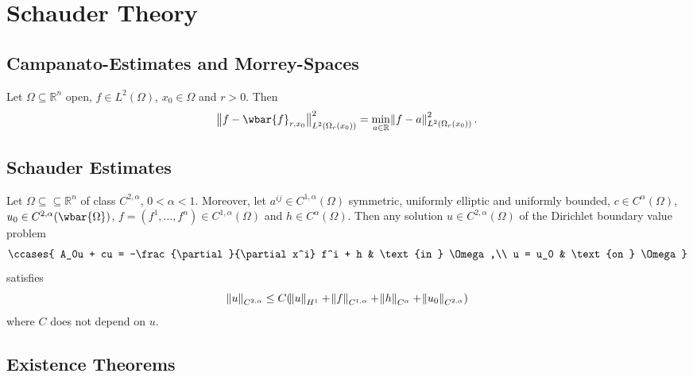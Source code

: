 \section*{Schauder Theory}
\subsection*{Campanato-Estimates and Morrey-Spaces}

\begin{lemma}
	Let $\Omega \subseteq \mathbb{R}^n$ open, $f \in L^2(\Omega)$, $x_0 \in \Omega$ and $r > 0$. Then
	\begin{equation*}
		\norm[1]{f - \wbar{f}_{r,x_0}}_{L^2(\Omega_r(x_0))}^2 = \min_{a \in \mathbb{R}} \norm{f - a}^2_{L^2(\Omega_r(x_0))}.
	\end{equation*}
\end{lemma}

\subsection*{Schauder Estimates}

\begin{theorem}
	\label{thm:gSe}
	Let $\Omega \subseteq \subseteq \mathbb{R}^n$ of class $C^{2,\alpha}$, $0 < \alpha < 1$. Moreover, let $a^{ij} \in C^{1,\alpha}(\Omega)$ symmetric, uniformly elliptic and uniformly bounded, $c \in C^\alpha(\Omega)$, $u_0 \in C^{2,\alpha}(\wbar{\Omega})$, $f = (f^1,\dots,f^n) \in C^{1,\alpha}(\Omega)$ and $h \in C^{\alpha}(\Omega)$. Then any solution $u \in C^{2,\alpha}(\Omega)$ of the Dirichlet boundary value problem
	\begin{align*}
		\ccases{
			A_0u + cu = -\frac{\partial}{\partial x^i} f^i + h & \text{in } \Omega,\\
			u = u_0 & \text{on } \Omega
		}
	\end{align*}
	\noindent satisfies
	\begin{equation*}
		\norm{u}_{C^{2,\alpha}} \leq C(\norm{u}_{H^1} + \norm{f}_{C^{1,\alpha}} + \norm{h}_{C^\alpha} + \norm{u_0}_{C^{2,\alpha}})
	\end{equation*}
	\noindent where $C$ does not depend on $u$.
\end{theorem}

\subsection*{Existence Theorems}

